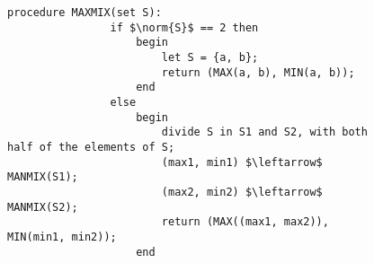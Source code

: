\documentclass{subfiles}
\begin{document}
\begin{figure*}[!h]
    \centering
    \begin{subfigure}[b]{0.9\textwidth}
        \begin{lstlisting}[language = algol]
            procedure MAXMIX(set S):
                if $\norm{S}$ == 2 then
                    begin
                        let S = {a, b};
                        return (MAX(a, b), MIN(a, b));
                    end
                else
                    begin
                        divide S in S1 and S2, with both half of the elements of S;
                        (max1, min1) $\leftarrow$ MANMIX(S1);
                        (max2, min2) $\leftarrow$ MANMIX(S2);
                        return (MAX((max1, max2)), MIN(min1, min2));
                    end
        \end{lstlisting}
    \end{subfigure}
\end{figure*}
\end{document}
